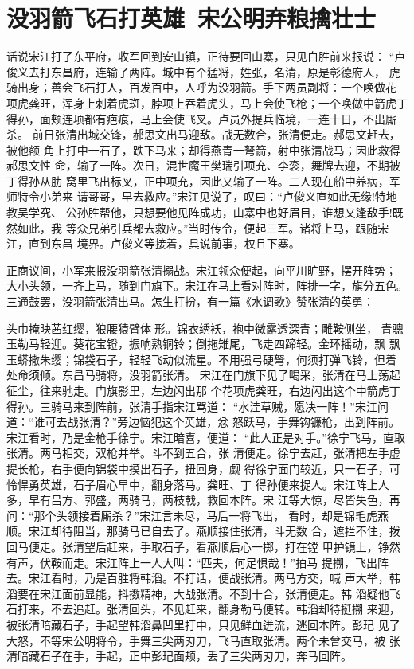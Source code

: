 \chapter{没羽箭飞石打英雄~宋公明弃粮擒壮士}

话说宋江打了东平府，收军回到安山镇，正待要回山寨，只见白胜前来报说：
“卢俊义去打东昌府，连输了两阵。城中有个猛将，姓张，名清，原是彰德府人，
虎骑出身；善会飞石打人，百发百中，人呼为没羽箭。手下两员副将：一个唤做花
项虎龚旺，浑身上刺着虎斑，脖项上吞着虎头，马上会使飞枪；一个唤做中箭虎丁
得孙，面颊连项都有疤痕，马上会使飞叉。卢员外提兵临境，一连十日，不出厮杀。
前日张清出城交锋，郝思文出马迎敌。战无数合，张清便走。郝思文赶去，被他额
角上打中一石子，跌下马来；却得燕青一弩箭，射中张清战马；因此救得郝思文性
命，输了一阵。次日，混世魔王樊瑞引项充、李衮，舞牌去迎，不期被丁得孙从肋
窝里飞出标叉，正中项充，因此又输了一阵。二人现在船中养病，军师特令小弟来
请哥哥，早去救应。”宋江见说了，叹曰：“卢俊义直如此无缘!特地教吴学究、
公孙胜帮他，只想要他见阵成功，山寨中也好眉目，谁想又逢敌手!既然如此，我
等众兄弟引兵都去救应。”当时传令，便起三军。诸将上马，跟随宋江，直到东昌
境界。卢俊义等接着，具说前事，权且下寨。

正商议间，小军来报没羽箭张清搦战。宋江领众便起，向平川旷野，摆开阵势；
大小头领，一齐上马，随到门旗下。宋江在马上看对阵时，阵排一字，旗分五色。
三通鼓罢，没羽箭张清出马。怎生打扮，有一篇《水调歌》赞张清的英勇：

头巾掩映茜红缨，狼腰猿臂体形。锦衣绣袄，袍中微露透深青；雕鞍侧坐，
青骢玉勒马轻迎。葵花宝镫，振响熟铜铃；倒拖雉尾，飞走四蹄轻。金环摇动，飘
飘玉蟒撒朱缨；锦袋石子，轻轻飞动似流星。不用强弓硬弩，何须打弹飞铃，但着
处命须倾。东昌马骑将，没羽箭张清。
宋江在门旗下见了喝采，张清在马上荡起征尘，往来驰走。门旗影里，左边闪出那
个花项虎龚旺，右边闪出这个中箭虎丁得孙。三骑马来到阵前，张清手指宋江骂道：
“水洼草贼，愿决一阵！”宋江问道：“谁可去战张清？”旁边恼犯这个英雄，忿
怒跃马，手舞钩镰枪，出到阵前。宋江看时，乃是金枪手徐宁。宋江暗喜，便道：
“此人正是对手。”徐宁飞马，直取张清。两马相交，双枪并举。斗不到五合，张
清便走。徐宁去赶，张清把左手虚提长枪，右手便向锦袋中摸出石子，扭回身，觑
得徐宁面门较近，只一石子，可怜悍勇英雄，石子眉心早中，翻身落马。龚旺、丁
得孙便来捉人。宋江阵上人多，早有吕方、郭盛，两骑马，两枝戟，救回本阵。宋
江等大惊，尽皆失色，再问：“那个头领接着厮杀？”宋江言未尽，马后一将飞出，
看时，却是锦毛虎燕顺。宋江却待阻当，那骑马已自去了。燕顺接住张清，斗无数
合，遮拦不住，拨回马便走。张清望后赶来，手取石子，看燕顺后心一掷，打在镗
甲护镜上，铮然有声，伏鞍而走。宋江阵上一人大叫：“匹夫，何足惧哉！”拍马
提搠，飞出阵去。宋江看时，乃是百胜将韩滔。不打话，便战张清。两马方交，喊
声大举，韩滔要在宋江面前显能，抖擞精神，大战张清。不到十合，张清便走。韩
滔疑他飞石打来，不去追赶。张清回头，不见赶来，翻身勒马便转。韩滔却待挺搠
来迎，被张清暗藏石子，手起望韩滔鼻凹里打中，只见鲜血迸流，逃回本阵。彭玘
见了大怒，不等宋公明将令，手舞三尖两刃刀，飞马直取张清。两个未曾交马，被
张清暗藏石子在手，手起，正中彭玘面颊，丢了三尖两刃刀，奔马回阵。

